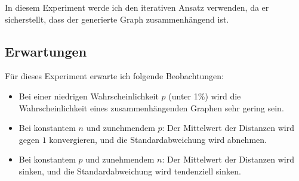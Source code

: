 In diesem Experiment werde ich den iterativen Ansatz verwenden, da er sicherstellt, dass der generierte Graph zusammenhängend ist.

\subsection{Erwartungen}

Für dieses Experiment erwarte ich folgende Beobachtungen:

\begin{itemize}
    \item Bei einer niedrigen Wahrscheinlichkeit \( p \) (unter 1\%) wird die Wahrscheinlichkeit eines zusammenhängenden Graphen sehr gering sein.
    \item Bei konstantem \( n \) und zunehmendem \( p \): Der Mittelwert der Distanzen wird gegen \( 1 \) konvergieren, und die Standardabweichung wird abnehmen.
    \item Bei konstantem \( p \) und zunehmendem \( n \): Der Mittelwert der Distanzen wird sinken, und die Standardabweichung wird tendenziell sinken.
\end{itemize}

